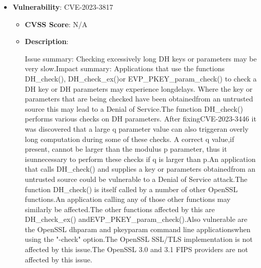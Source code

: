 \documentclass{article}
\begin{document}
\begin{itemize}
        \item \textbf{Vulnerability}: CVE-2023-3817
        \begin{itemize}
            \item \textbf{CVSS Score}:  N/A 
            \item \textbf{Description}:
            \parbox[t]{0.9\linewidth}{
                \ttfamily Issue summary: Checking excessively long DH keys or parameters may be very slow.Impact summary: Applications that use the functions DH\_check(), DH\_check\_ex()or EVP\_PKEY\_param\_check() to check a DH key or DH parameters may experience longdelays. Where the key or parameters that are being checked have been obtainedfrom an untrusted source this may lead to a Denial of Service.The function DH\_check() performs various checks on DH parameters. After fixingCVE-2023-3446 it was discovered that a large q parameter value can also triggeran overly long computation during some of these checks. A correct q value,if present, cannot be larger than the modulus p parameter, thus it isunnecessary to perform these checks if q is larger than p.An application that calls DH\_check() and supplies a key or parameters obtainedfrom an untrusted source could be vulnerable to a Denial of Service attack.The function DH\_check() is itself called by a number of other OpenSSL functions.An application calling any of those other functions may similarly be affected.The other functions affected by this are DH\_check\_ex() andEVP\_PKEY\_param\_check().Also vulnerable are the OpenSSL dhparam and pkeyparam command line applicationswhen using the "-check" option.The OpenSSL SSL/TLS implementation is not affected by this issue.The OpenSSL 3.0 and 3.1 FIPS providers are not affected by this issue.
            }
        \end{itemize}
    

\end{itemize}
\end{document}
